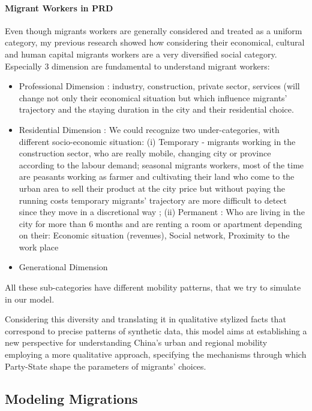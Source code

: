 \paragraph{Migrant Workers in PRD}


Even though migrants workers are generally considered and treated as a uniform category, my previous research showed how considering their economical, cultural and human capital migrants workers are a very diversified social category. Especially 3 dimension are fundamental to understand migrant workers:
\begin{itemize}
\item Professional Dimension : industry, construction, private sector, services (will change not only their economical situation but which influence  migrants’ trajectory and the staying duration in the city and their residential choice.
\item Residential Dimension : We could recognize two under-categories, with different socio-economic situation: (i) Temporary - migrants working in the construction sector, who are really mobile, changing city or province according to the labour demand;  seasonal migrants workers, most of the time are peasants working as farmer and cultivating their land who come to the urban area to sell their product at the city price but without paying the running costs temporary migrants’ trajectory are more difficult to detect since they move in a discretional way ; (ii) Permanent :  Who are living in the city for more than 6 months and are renting a room or apartment depending on their: Economic situation (revenues), Social network, Proximity to the work place
\item Generational Dimension
\end{itemize}


All these sub-categories have different mobility patterns, that we try to simulate in our model.

Considering this diversity and translating it in qualitative stylized facts that correspond to precise patterns of synthetic data, this model aims at establishing a new perspective for understanding China’s urban and regional mobility employing a more qualitative approach, specifying the mechanisms through which Party-State shape the parameters of migrants’ choices.





\subsection{Modeling Migrations}

